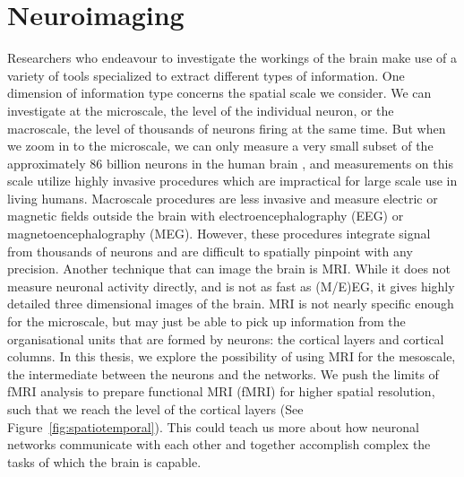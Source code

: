 \section*{Neuroimaging}
Researchers who endeavour to investigate the workings of the brain make use of a variety of tools specialized to extract different types of information. One dimension of information type concerns the spatial scale we consider. We can investigate at the microscale, the level of the individual neuron, or the macroscale, the level of thousands of neurons firing at the same time. But when we zoom in to the microscale, we can only measure a very small subset of the approximately 86 billion neurons in the human brain \cite{Herculano-Houzel2009}, and measurements on this scale utilize highly invasive procedures which are impractical for large scale use in living humans. Macroscale procedures are less invasive and measure electric or magnetic fields outside the brain with electroencephalography (EEG) or magnetoencephalography (MEG). However, these procedures integrate signal from thousands of neurons and are difficult to spatially pinpoint with any precision. Another technique that can image the brain is MRI. While it does not measure neuronal activity directly, and is not as fast as (M/E)EG, it gives highly detailed three dimensional images of the brain. MRI is not nearly specific enough for the microscale, but may just be able to pick up information from the organisational units that are formed by neurons: the cortical layers and cortical columns. In this thesis, we explore the possibility of using MRI for the mesoscale, the intermediate between the neurons and the networks. We push the limits of fMRI analysis to prepare functional MRI (fMRI) for higher spatial resolution, such that we reach the level of the cortical layers (See Figure~\ref{fig:spatiotemporal}). This could teach us more about how neuronal networks communicate with each other and together accomplish complex the tasks of which the brain is capable.


